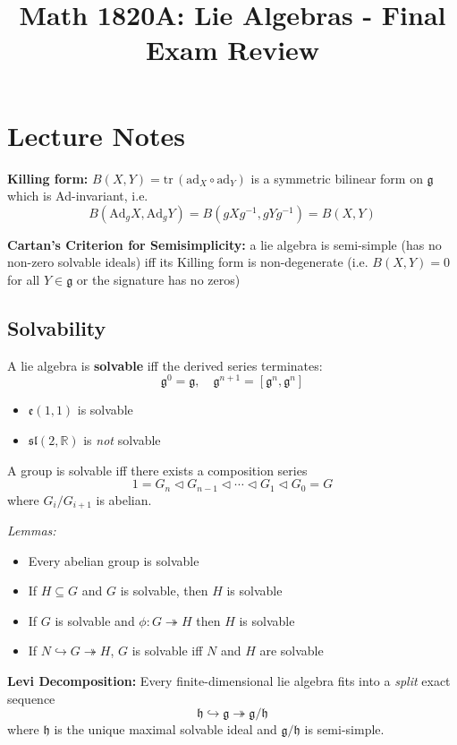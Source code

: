 \documentclass[12pt]{article}
\title{Math 1820A: Lie Algebras - Final Exam Review}
\author{}
\date{}
\newcommand{\R}{\mathbb{R}}
\newcommand{\tr}{\text{tr}\,}
\newcommand{\g}{\mathfrak{g}}
\newcommand{\h}{\mathfrak{h}}
\newcommand{\Ad}{\text{Ad}}
\newcommand{\ad}{\text{ad}}
\begin{document}
\maketitle
\vspace*{-0.75in}

\section{Lecture Notes}

\textbf{Killing form:} $B(X, Y) = \tr(\ad_X \circ \ad_Y)$ is a symmetric bilinear form on $\g$ which is Ad-invariant, i.e. 
\[B(\Ad_g X, \Ad_g Y) = B(gXg^{-1}, gYg^{-1}) = B(X, Y)\]

\textbf{Cartan's Criterion for Semisimplicity:} a lie algebra is semi-simple (has no non-zero solvable ideals) iff its Killing form is non-degenerate (i.e. $B(X, Y) = 0$ for all $Y \in \g$ or the signature has no zeros) 

\subsection*{Solvability} 
A lie algebra is \textbf{solvable} iff the derived series terminates: 
\[\g^0 = \g, \quad \g^{n+1} = [\g^n, \g^n]\]
\begin{itemize}
    \item $\mathfrak{e}(1, 1)$ is solvable 
    \item $\mathfrak{sl}(2, \R)$ is \emph{not} solvable
\end{itemize}

A group is solvable iff there exists a composition series 
\[1 = G_n \triangleleft G_{n-1} \triangleleft \cdots \triangleleft G_1 \triangleleft G_0 = G\]
where $G_i/G_{i+1}$ is abelian.

\emph{Lemmas:}
\begin{itemize}
    \item Every abelian group is solvable 
    \item If $H \subseteq G$ and $G$ is solvable, then $H$ is solvable
    \item If $G$ is solvable and $\phi: G \twoheadrightarrow H$ then $H$ is solvable 
    \item If $N \hookrightarrow G \twoheadrightarrow H$, $G$ is solvable iff $N$ and $H$ are solvable
\end{itemize}

\textbf{Levi Decomposition:} Every finite-dimensional lie algebra fits into a \emph{split} exact sequence 
\[\h \hookrightarrow \g \twoheadrightarrow \g/\h\]
where $\h$ is the unique maximal solvable ideal and $\g/\h$ is semi-simple. 
\end{document}
